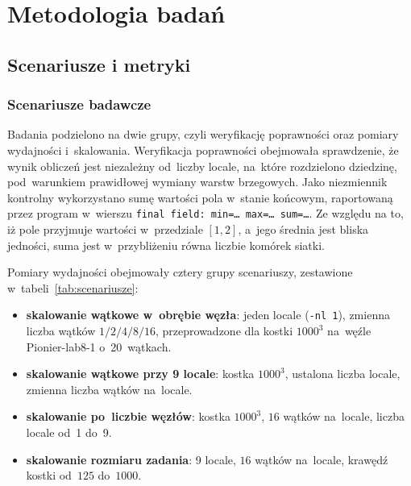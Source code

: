 \chapter{Metodologia badań}
\label{ch:metodologia}

\section{Scenariusze i metryki}
\label{sec:scenariusze}

\subsection{Scenariusze badawcze}

Badania podzielono na dwie grupy, czyli weryfikację poprawności oraz pomiary wydajności
i~skalowania. Weryfikacja poprawności obejmowała sprawdzenie,
że wynik obliczeń jest niezależny od~liczby locale, na~które rozdzielono dziedzinę, pod~warunkiem
prawidłowej wymiany warstw brzegowych. Jako niezmiennik kontrolny wykorzystano sumę wartości pola
w~stanie końcowym, raportowaną przez program w~wierszu \texttt{final field: min=\ldots{}
max=\ldots{} sum=\ldots}. Ze względu na to, iż pole przyjmuje wartości w~przedziale $[1,2]$, a~jego
średnia jest bliska jedności, suma jest w~przybliżeniu równa liczbie komórek siatki.

Pomiary wydajności obejmowały cztery grupy scenariuszy, zestawione w~tabeli~\ref{tab:scenariusze}:
\begin{itemize}
  \item \textbf{skalowanie wątkowe w~obrębie węzła}: jeden locale (\texttt{-nl 1}),
        zmienna liczba wątków $1/2/4/8/16$, przeprowadzone dla kostki $1000^3$ na~węźle
        Pionier-lab8-1 o~20~wątkach.
  \item \textbf{skalowanie wątkowe przy 9 locale}: kostka $1000^3$, ustalona
        liczba locale, zmienna liczba wątków na~locale.
  \item \textbf{skalowanie po~liczbie węzłów}: kostka $1000^3$, $16$ wątków na~locale,
        liczba locale od~1 do~9.
  \item \textbf{skalowanie rozmiaru zadania}: 9 locale, $16$ wątków na~locale,
        krawędź kostki od~$125$ do~$1000$.
\end{itemize}

